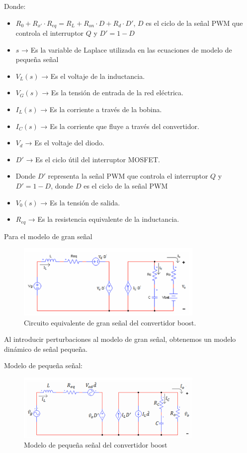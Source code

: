 Donde:
\begin{itemize}
	\item \( R_0 + R_{x'} \cdot R_{eq} = R_L + R_{on} \cdot D + R_d \cdot D' \), \( D \) es el ciclo de la señal PWM que controla el interruptor \( Q \) y \( D' = 1 - D \)
	\item \(s\) → Es la variable de Laplace utilizada en las ecuaciones de modelo de pequeña señal
	\item \(V_L(s)\) → Es el voltaje de la inductancia.
	\item \(V_G(s)\) → Es la tensión de entrada de la red eléctrica.
	\item \(I_L(s)\) → Es la corriente a través de la bobina.
	\item \(I_C(s)\) → Es la corriente que fluye a través del convertidor.
	\item \(V_d\) → Es el voltaje del diodo.
	\item \(D'\) → Es el ciclo útil del interruptor MOSFET.
	\item Donde \(D'\) representa la señal PWM que controla el interruptor \(Q\) y \(D' = 1 - D\), donde \(D\) es el ciclo de la señal PWM
	\item \(V_0(s)\) → Es la tensión de salida.
	\item \(R_{eq}\) → Es la resistencia equivalente de la inductancia.
\end{itemize}
\newpage

Para el modelo de gran señal

\begin{figure}[H] %
	\centering
	\includegraphics[width=0.8\textwidth]{3.png}
	\caption{Circuito equivalente de gran señal del convertidor boost.}
\end{figure}
Al introducir perturbaciones al modelo de gran señal, obtenemos un modelo dinámico de señal pequeña.

Modelo de pequeña señal:

\begin{figure}[h]
	\centering
	\includegraphics[width=0.8\textwidth]{2.png} %
	\caption{Modelo de pequeña señal del convertidor boost}
	\label{fig:pequena_senal}
\end{figure}

